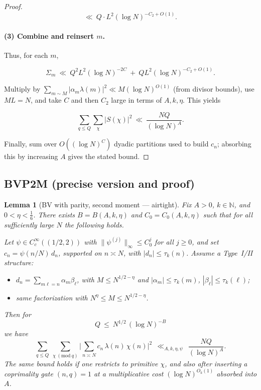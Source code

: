 \documentclass[11pt]{article}
\newtheorem{lemma}{Lemma}[part]
\theoremstyle{definition}
\theoremstyle{remark}
\numberwithin{equation}{part}
\begin{document}
\begin{proof}
	$$
		\ll\ Q\cdot L^2 (\log N)^{-C_2+O(1)}.
	$$

	\paragraph{(3) Combine and reinsert $m$.}
	Thus, for each $m$,

	$$
		\Sigma_m\ \ll\ Q^2 L^2 (\log N)^{-2C} \ +\ Q L^2 (\log N)^{-C_2+O(1)}.
	$$

	Multiply by $\sum_{m\sim M}|\alpha_m\lambda(m)|^2\ll M(\log N)^{O(1)}$ (from divisor bounds), use $ML=N$, and take $C$ and then $C_2$ large in terms of $A,k,\eta$. This yields

	$$
		\sum_{q\le Q}\sum_{\chi}|S(\chi)|^2\ \ll\ \frac{NQ}{(\log N)^A}.
	$$

	Finally, sum over $O((\log N)^C)$ dyadic partitions used to build $c_n$; absorbing this by increasing $A$ gives the stated bound.
\end{proof}

\subsection{BVP2M (precise version and proof)}

\begin{lemma}[BV with parity, second moment — airtight]\label{lem:BV-parity-airtight}
	Fix $A>0$, $k\in\mathbb N$, and $0<\eta<\tfrac16$. There exists $B=B(A,k,\eta)$ and $C_0=C_0(A,k,\eta)$ such that for all sufficiently large $N$ the following holds.

	Let $\psi\in C_c^\infty((1/2,2))$ with $\|\psi^{(j)}\|_\infty\le C_0^{j}$ for all $j\ge0$, and set $c_n=\psi(n/N)\,d_n$, supported on $n\asymp N$, with $|d_n|\le \tau_k(n)$. Assume a Type~I/II structure:
	\begin{itemize}
		\item[\emph{Type I:}] $d_n=\sum_{m\ell=n}\alpha_m\beta_\ell$, with $M\le N^{1/2-\eta}$ and $|\alpha_m|\le \tau_k(m)$, $|\beta_\ell|\le \tau_k(\ell)$;
		\item[\emph{Type II:}] same factorization with $N^{\eta}\le M\le N^{1/2-\eta}$.
	\end{itemize}
	Then for
	\[
		Q\ \le\ N^{1/2}\,(\log N)^{-B}
	\]
	we have
	\[
		\sum_{q\le Q}\ \sum_{\chi\ (\mathrm{mod}\ q)}
		\Bigg|\sum_{n\asymp N} c_n\,\lambda(n)\,\chi(n)\Bigg|^2
		\ \ \ll_{A,k,\eta,\psi}\ \ \frac{NQ}{(\log N)^{A}}.
	\]
	The same bound holds if one restricts to primitive $\chi$, and also after inserting a coprimality gate $(n,q)=1$ at a multiplicative cost $(\log N)^{O_k(1)}$ absorbed into $A$.
\end{lemma}
\end{document}
